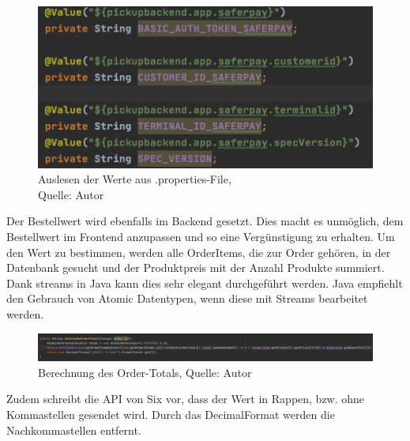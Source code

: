  \begin{figure}[H]
	\centering
	\includegraphics[scale=0.4]{images/valuesFromProperties.PNG}
	\caption[Auslesen der Werte aus .properties-File]{Auslesen der Werte aus .properties-File,\\ Quelle: Autor}
	\label{img: valuesFromProperties}
\end{figure} 
Der Bestellwert wird ebenfalls im Backend gesetzt. Dies macht es unmöglich, dem Bestellwert im Frontend anzupassen und so eine Vergünstigung zu erhalten. Um den Wert zu bestimmen, werden alle OrderItems, die zur Order gehören, in der Datenbank gesucht und der Produktpreis mit der Anzahl Produkte summiert. Dank streams in Java kann dies sehr elegant durchgeführt werden. Java empfiehlt den Gebrauch von Atomic Datentypen, wenn diese mit Streams bearbeitet werden. 
 \begin{figure}[H]
	\centering
	\includegraphics[width=1\textwidth]{images/calculateTotal.PNG}
	\caption[Berechnung des Order-Totals]{Berechnung des Order-Totals, Quelle: Autor}
	\label{img: orderTotal}
\end{figure} 
Zudem schreibt die API von Six vor, dass der Wert in Rappen, bzw. ohne Kommastellen gesendet wird. 
Durch das DecimalFormat werden die Nachkommastellen entfernt. 

